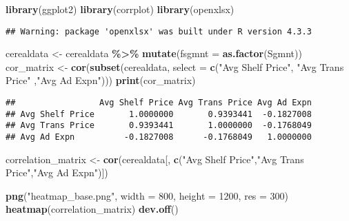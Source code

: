 \documentclass[
]{article}
\newenvironment{Shaded}{\begin{snugshade}}{\end{snugshade}}
\newcommand{\AttributeTok}[1]{\textcolor[rgb]{0.13,0.29,0.53}{#1}}
\newcommand{\DecValTok}[1]{\textcolor[rgb]{0.00,0.00,0.81}{#1}}
\newcommand{\FunctionTok}[1]{\textcolor[rgb]{0.13,0.29,0.53}{\textbf{#1}}}
\newcommand{\NormalTok}[1]{#1}
\newcommand{\OtherTok}[1]{\textcolor[rgb]{0.56,0.35,0.01}{#1}}
\newcommand{\SpecialCharTok}[1]{\textcolor[rgb]{0.81,0.36,0.00}{\textbf{#1}}}
\newcommand{\StringTok}[1]{\textcolor[rgb]{0.31,0.60,0.02}{#1}}
\begin{document}
\begin{Shaded}
\begin{Highlighting}[]
\FunctionTok{library}\NormalTok{(ggplot2)}
\FunctionTok{library}\NormalTok{(corrplot)}
\FunctionTok{library}\NormalTok{(openxlsx)}
\end{Highlighting}
\end{Shaded}

\begin{verbatim}
## Warning: package 'openxlsx' was built under R version 4.3.3
\end{verbatim}

\begin{Shaded}
\begin{Highlighting}[]
\NormalTok{cerealdata }\OtherTok{\textless{}{-}}\NormalTok{ cerealdata }\SpecialCharTok{\%\textgreater{}\%}
  \FunctionTok{mutate}\NormalTok{(}\AttributeTok{fsgmnt =} \FunctionTok{as.factor}\NormalTok{(Sgmnt))}
\NormalTok{cor\_matrix }\OtherTok{\textless{}{-}} \FunctionTok{cor}\NormalTok{(}\FunctionTok{subset}\NormalTok{(cerealdata, }\AttributeTok{select =} \FunctionTok{c}\NormalTok{(}\StringTok{"Avg Shelf Price"}\NormalTok{, }\StringTok{"Avg Trans Price"}\NormalTok{ ,}\StringTok{"Avg Ad Expn"}\NormalTok{)))}
\FunctionTok{print}\NormalTok{(cor\_matrix)}
\end{Highlighting}
\end{Shaded}

\begin{verbatim}
##                 Avg Shelf Price Avg Trans Price Avg Ad Expn
## Avg Shelf Price       1.0000000       0.9393441  -0.1827008
## Avg Trans Price       0.9393441       1.0000000  -0.1768049
## Avg Ad Expn          -0.1827008      -0.1768049   1.0000000
\end{verbatim}

\begin{Shaded}
\begin{Highlighting}[]
\NormalTok{correlation\_matrix }\OtherTok{\textless{}{-}} \FunctionTok{cor}\NormalTok{(cerealdata[, }\FunctionTok{c}\NormalTok{(}\StringTok{"Avg Shelf Price"}\NormalTok{,}\StringTok{"Avg Trans Price"}\NormalTok{,}\StringTok{"Avg Ad Expn"}\NormalTok{)])}

\FunctionTok{png}\NormalTok{(}\StringTok{"heatmap\_base.png"}\NormalTok{, }\AttributeTok{width =} \DecValTok{800}\NormalTok{, }\AttributeTok{height =} \DecValTok{1200}\NormalTok{, }\AttributeTok{res =} \DecValTok{300}\NormalTok{)}
\FunctionTok{heatmap}\NormalTok{(correlation\_matrix)}
\FunctionTok{dev.off}\NormalTok{()}
\end{Highlighting}
\end{Shaded}
\end{document}
